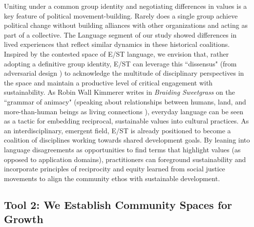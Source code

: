 \documentclass[manuscript,review,anonymous]{acmart}
\begin{document}
Uniting under a common group identity and negotiating differences in values is a key feature of political movement-building. Rarely does a single group achieve political change without building alliances with other organizations \cite{post_multi-organizational_2015} and acting as part of a collective. The Language segment of our study showed differences in lived experiences that reflect similar dynamics in these historical coalitions. 
Inspired by the contested space of E/ST language, we envision that, rather adopting a definitive group identity, E/ST can leverage this ``dissensus" (from adversarial design \cite{disalvo_adversarial_2015}) to acknowledge the multitude of disciplinary perspectives in the space and maintain a productive level of critical engagement with sustainability. As Robin Wall Kimmerer writes in \textit{Braiding Sweetgrass} on the ``grammar of animacy" (speaking about relationships between humans, land, and more-than-human beings as living connections \cite{kimmerer_braiding_2015}), everyday language can be seen as a tactic for embedding reciprocal, sustainable values into cultural practices. As an interdisciplinary, emergent field, E/ST is already positioned to become a coalition of disciplines working towards shared development goals. %
By leaning into language disagreements as opportunities to find terms that highlight values (as opposed to application domains),
practitioners can foreground sustainability and incorporate principles of reciprocity and equity learned from social justice movements to align the community ethos with sustainable development.

\subsection{Tool 2: We Establish Community Spaces for Growth}
\end{document}
